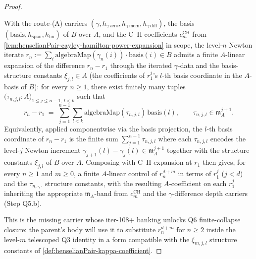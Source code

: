 \begin{proof}
\begin{lemma}
\label{lem:henselianPair-r-n-minus-r-1-in-gamma-finsupp}
With the route-(A) carriers
$(\gamma, h_{\gamma\,\mathrm{zero}}, h_{\gamma\,\mathrm{mem}},
h_{\gamma\,\mathrm{diff}})$, the basis $(\mathrm{basis}, h_{\mathrm{span}},
h_{\mathrm{lin}})$ of $B$ over $A$, and the C--H coefficients
$c^{\mathrm{CH}}_m$ from
\cref{lem:henselianPair-cayley-hamilton-power-expansion} in
scope, the level-$n$ Newton iterate $r_n :=
\sum_{i} \mathrm{algebraMap}(\gamma_n(i)) \cdot \mathrm{basis}(i)
\in B$ admits a finite $A$-linear expansion of the difference
$r_n - r_1$ through the iterated $\gamma$-data and the
basis-structure constants $\xi_{j,l} \in A$ (the
coefficients of $r_1^{j}$'s $l$-th basis coordinate in the
$A$-basis of $B$): for every $n \ge 1$, there exist finitely
many tuples
$\bigl(\tau_{n,j,l} : A\bigr)_{1 \le j \le n - 1,\ l < k}$ such
that
\[
r_n - r_1 \;=\; \sum_{j = 1}^{n - 1} \sum_{l < k}
\mathrm{algebraMap}(\tau_{n,j,l})\,\mathrm{basis}(l),
\qquad \tau_{n,j,l} \in \mathfrak m_A^{j + 1}.
\]
Equivalently, applied componentwise via the basis projection,
the $l$-th basis coordinate of $r_n - r_1$ is the finite sum
$\sum_{j = 1}^{n - 1} \tau_{n,j,l}$ where each $\tau_{n,j,l}$
encodes the level-$j$ Newton increment
$\gamma_{j+1}(l) - \gamma_j(l) \in \mathfrak m_A^{j+1}$ together
with the structure constants $\xi_{j,l}$ of $B$ over $A$.
Composing with C--H expansion at $r_1$ then gives, for every
$n \ge 1$ and $m \ge 0$, a finite $A$-linear control of
$r_n^{d + m}$ in terms of $r_1^{j}$ ($j < d$) and the
$\tau_{n, \cdot, \cdot}$ structure constants, with the resulting
$A$-coefficient on each $r_1^{j}$ inheriting the appropriate
$\mathfrak m_A$-band from $c^{\mathrm{CH}}_m$ and the
$\gamma$-difference depth carriers (Step Q5.b).
\end{lemma}

This is the missing carrier whose iter-108+ banking unlocks Q6
finite-collapse closure: the parent's body will use it to
substitute $r_n^{d+m}$ for $n \ge 2$ inside the level-$m$
telescoped Q3 identity in a form compatible with the
$\xi_{m,j,l}$ structure constants of
\cref{def:henselianPair-kappa-coefficient}.


\end{proof}
